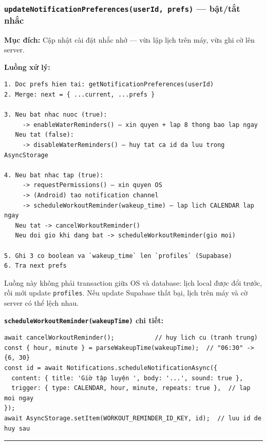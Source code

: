 \documentclass[12pt,a4paper]{article}
\providecommand{\passthrough}[1]{#1}
\begin{document}
\subsubsection{\texorpdfstring{\texttt{updateNotificationPreferences(userId,\ prefs)}
--- bật/tắt
nhắc}{updateNotificationPreferences(userId, prefs) --- bật/tắt nhắc}}\label{updatenotificationpreferencesuserid-prefs-bux1eadttux1eaft-nhux1eafc}

\textbf{Mục đích:} Cập nhật cài đặt nhắc nhở --- vừa lập lịch trên máy,
vừa ghi cờ lên server.

\textbf{Luồng xử lý:}

\begin{lstlisting}
1. Doc prefs hien tai: getNotificationPreferences(userId)
2. Merge: next = { ...current, ...prefs }

3. Neu bat nhac nuoc (true):
     -> enableWaterReminders() — xin quyen + lap 8 thong bao lap ngay
   Neu tat (false):
     -> disableWaterReminders() — huy tat ca id da luu trong AsyncStorage

4. Neu bat nhac tap (true):
     -> requestPermissions() — xin quyen OS
     -> (Android) tao notification channel
     -> scheduleWorkoutReminder(wakeup_time) — lap lich CALENDAR lap ngay
   Neu tat -> cancelWorkoutReminder()
   Neu doi gio khi dang bat -> scheduleWorkoutReminder(gio moi)

5. Ghi 3 co boolean va `wakeup_time` len `profiles` (Supabase)
6. Tra next prefs
\end{lstlisting}

Luồng này không phải transaction giữa OS và database: lịch local được
đổi trước, rồi mới update \passthrough{\lstinline!profiles!}. Nếu update
Supabase thất bại, lịch trên máy và cờ server có thể lệch nhau.

\textbf{\passthrough{\lstinline!scheduleWorkoutReminder(wakeupTime)!}
chi tiết:}

\begin{lstlisting}
await cancelWorkoutReminder();           // huy lich cu (tranh trung)
const { hour, minute } = parseWakeupTime(wakeupTime);  // "06:30" -> {6, 30}
const id = await Notifications.scheduleNotificationAsync({
  content: { title: 'Giờ tập luyện ', body: '...', sound: true },
  trigger: { type: CALENDAR, hour, minute, repeats: true },  // lap moi ngay
});
await AsyncStorage.setItem(WORKOUT_REMINDER_ID_KEY, id);  // luu id de huy sau

\end{lstlisting}

\begin{center}\rule{0.5\linewidth}{0.5pt}\end{center}
\end{document}
